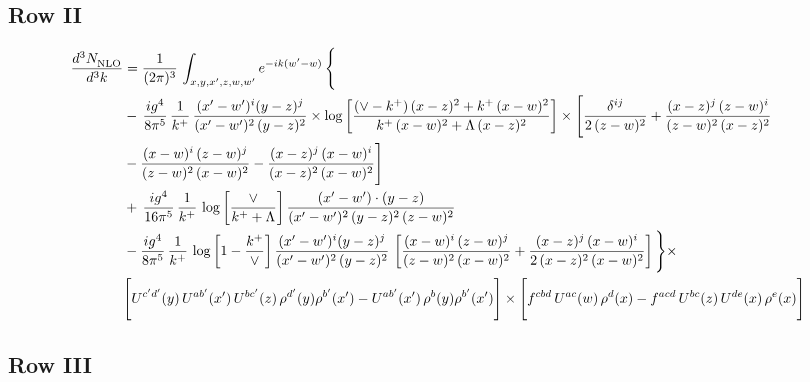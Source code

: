 \documentclass[9pt]{article}
\numberwithin{equation}{section}
\begin{document}
\subsection{Row II}
\begin{align}
     \frac{d^{3}N_{\rm NLO}^{\rm}}{d^{3}k}  & =  \frac{1}{(2\pi)^{3}}\, \int_{x,y,x',z,w,w^{\prime}} e^{-ik(w^{\prime}-w)}\, \Bigg\{\notag \\ & -\,\frac{ig^{4}}{8\pi^{5}}\,\frac{1}{k^{+}}\,\frac{(x'-w')^{i}(y-z)^{j}}{(x'-w')^{2}\,(y-z)^{2}}\times \log{\left[\frac{(\vee-k^{+})\,(x-z)^{2}+k^{+}\,(x-w)^{2}}{k^{+}\,(x-w)^{2}+\Lambda\, (x-z)^{2}}\right]}\times \Bigg[\frac{\delta^{ij}}{2\,(z-w)^{2}}+\frac{(x-z)^{j}\,(z-w)^{i}}{(z-w)^{2}\,(x-z)^{2}}\notag \\ & -\frac{(x-w)^{i}\,(z-w)^{j}}{(z-w)^{2}\,(x-w)^{2}}-\frac{(x-z)^{j}\,(x-w)^{i}}{(x-z)^{2}\,(x-w)^{2}}\Bigg]\notag \\ & +\,\frac{ig^{4}}{16\pi^{5}}\,\frac{1}{k^{+}}\,\log{\left[\frac{\vee}{k^{+}+\Lambda}\right]}\, \frac{(x'-w')\cdot (y-z)}{(x'-w')^{2}\,(y-z)^{2}\,(z-w)^{2}}\notag \\ & -\frac{ig^{4}}{8\pi^{5}}\,\frac{1}{k^{+}}\, \log{\left[1-\frac{k^{+}}{\vee}\right]}\,\frac{(x'-w')^{i}(y-z)^{j}}{(x'-w')^{2}\,(y-z)^{2}}\,\left[\frac{(x-w)^{i}\,(z-w)^{j}}{(z-w)^{2}\,(x-w)^{2}}+\frac{(x-z)^{j}\,(x-w)^{i}}{2\,(x-z)^{2}\, (x-w)^{2}}\right]\Bigg\}\times \notag \\ & \Bigg[U^{c'd'}(y)\,U^{ab'}(x')\,U^{bc'}(z)\,\rho^{d'}(y)\rho^{b'}(x')-U^{ab'}(x')\,\rho^{b}(y)\rho^{b'}(x')\Bigg]\times\Bigg[f^{cbd}\,U^{ac}(w)\,\rho^{d}(x)-f^{acd}\, U^{bc}(z)\,U^{de}(x)\,\rho^{e}(x)\Bigg]
\end{align}
 \subsection{Row III}
\end{document}
